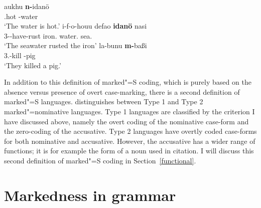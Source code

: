 \begin{exe}\ex\label{Nias}
\begin{xlist} 
\ex\label{NiasS}\gll aukhu \textbf{n-}idan\"o\\
{\stat}.hot {\abs}-water\\
\glt `The water is hot.'
\ex\label{NiasAP}\gll i-f-o-houu	defao 	\textbf{idan\"o} 	nasi\\
3\sg{}-\caus{}-have-rust	iron.\abs{}	water.\erg{}	sea.\abs{}\\
\glt `The seawater rusted the iron'
\ex\label{NiasP}\gll  la-bunu \textbf{m-}ba\ss i\\
3\pl{}.{\rls}-kill \abs{}-pig\\
\glt `They killed a pig.'
\end{xlist}
\end{exe}

In addition to this definition of marked"=S coding, which is purely based on the absence versus presence of overt case-marking, there is a second definition of marked"=S languages. \citet{Koenig:2006} distinguishes between Type 1 and Type 2 marked"=nominative languages. 
Type 1 languages are classified by the criterion I have discussed above, namely the overt coding of the nominative case-form and the zero-coding of the accusative. 
Type 2 languages have overtly coded case-forms for both nominative and accusative. 
However, the accusative has a wider range of functions; it is for example the form of a noun used in citation. 
I will discuss this second definition of marked"=S coding in Section~\ref{functional}.


\section{Markedness in grammar}\label{markedness}


